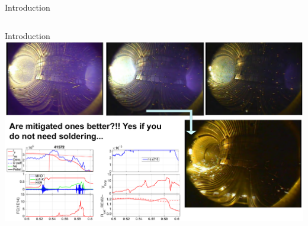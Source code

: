 \documentclass{beamer}
\begin{document}
\begin{frame}{Introduction}
\begin{columns}
\begin{column}{0.3\textwidth}
    \end{column}
\end{columns} 

\end{frame}

\begin{frame}{Introduction}
    \includegraphics[width=1\linewidth]{frame/melting.png}
\end{frame}
\end{document}

